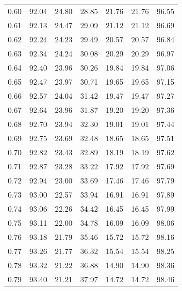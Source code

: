\begin{tabular}{|c|c|c|c|c|c|c|}
      0.60 &     92.04 &     24.80 &      28.85 &   21.76 &      21.76 &         96.55 \\
      0.61 &     92.13 &     24.47 &      29.09 &   21.12 &      21.12 &         96.69 \\
      0.62 &     92.24 &     24.23 &      29.49 &   20.57 &      20.57 &         96.84 \\
      0.63 &     92.34 &     24.24 &      30.08 &   20.29 &      20.29 &         96.97 \\
      0.64 &     92.40 &     23.96 &      30.26 &   19.84 &      19.84 &         97.06 \\
      0.65 &     92.47 &     23.97 &      30.71 &   19.65 &      19.65 &         97.15 \\
      0.66 &     92.57 &     24.04 &      31.42 &   19.47 &      19.47 &         97.27 \\
      0.67 &     92.64 &     23.96 &      31.87 &   19.20 &      19.20 &         97.36 \\
      0.68 &     92.70 &     23.94 &      32.30 &   19.01 &      19.01 &         97.44 \\
      0.69 &     92.75 &     23.69 &      32.48 &   18.65 &      18.65 &         97.51 \\
      0.70 &     92.82 &     23.43 &      32.89 &   18.19 &      18.19 &         97.62 \\
      0.71 &     92.87 &     23.28 &      33.22 &   17.92 &      17.92 &         97.69 \\
      0.72 &     92.94 &     23.00 &      33.69 &   17.46 &      17.46 &         97.79 \\
      0.73 &     93.00 &     22.57 &      33.94 &   16.91 &      16.91 &         97.89 \\
      0.74 &     93.06 &     22.26 &      34.42 &   16.45 &      16.45 &         97.99 \\
      0.75 &     93.11 &     22.00 &      34.78 &   16.09 &      16.09 &         98.06 \\
      0.76 &     93.18 &     21.79 &      35.46 &   15.72 &      15.72 &         98.16 \\
      0.77 &     93.26 &     21.77 &      36.32 &   15.54 &      15.54 &         98.25 \\
      0.78 &     93.32 &     21.22 &      36.88 &   14.90 &      14.90 &         98.36 \\
      0.79 &     93.40 &     21.21 &      37.97 &   14.72 &      14.72 &         98.46 \\

\end{tabular}
